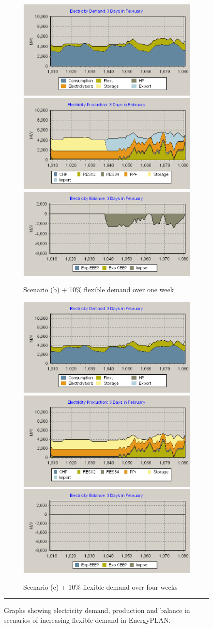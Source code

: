 \begin{figure}[htbp]
	\vspace{0.25cm}
		
	\begin{subfigure}{\textwidth}
		\centering
		\includegraphics[width=.3\textwidth]{figures/B16-3day-demand.png}\hfill
		\includegraphics[width=.3\textwidth]{figures/B16-3day-production.png}\hfill
		\includegraphics[width=.325\textwidth]{figures/B16-3day-balance.png}
		\caption{Scenario (b) + 10\% flexible demand over one week}
		\label{fig:B16}
	\end{subfigure}
	
	\vspace{0.25cm}
		
	\begin{subfigure}{\textwidth}
		\centering
		\includegraphics[width=.3\textwidth]{figures/B17-3day-demand.png}\hfill
		\includegraphics[width=.3\textwidth]{figures/B17-3day-production.png}\hfill
		\includegraphics[width=.325\textwidth]{figures/B17-3day-balance.png}
		\caption{Scenario (c) + 10\% flexible demand over four weeks}
		\label{fig:B17}
	\end{subfigure}

	\vspace{0.25cm}

	\rule{\textwidth}{0.5pt} %
	\caption{Graphs showing electricity demand, production and balance in scenarios of increasing flexible demand in EnergyPLAN.}
	\label{fig:flex_dem}
\end{figure}